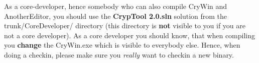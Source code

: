 As a core-developer, hence somebody who can also compile CryWin and AnotherEditor, you should use the \textbf{CrypTool 2.0.sln} solution from the trunk/CoreDeveloper/ directory (this directory is \textbf{not} visible to you if you are not a core developer). As a core developer you should know, that when compiling you \textbf{change} the CryWin.exe which is visible to everybody else. Hence, when doing a checkin, please make sure you \textit{really} want to checkin a new binary.
